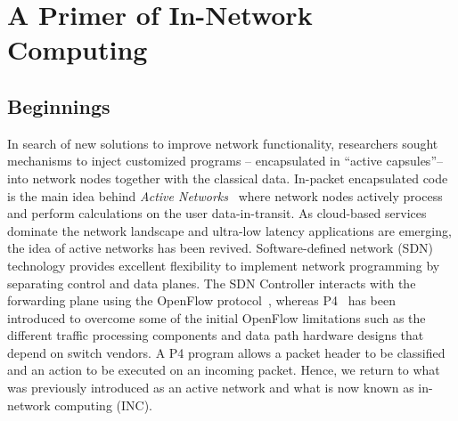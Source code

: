 \section{A Primer of In-Network Computing}\label{INC}
\subsection{Beginnings}
\noindent In search of new solutions to improve network functionality, researchers sought mechanisms to inject customized programs -- encapsulated in “active capsules”-- into network nodes together with the classical data. In-packet encapsulated code is the main idea behind \textit{Active Networks}~\cite{ACTIVE} where network nodes actively process and perform calculations on the user data-in-transit.
As cloud-based services dominate the network landscape and ultra-low latency applications are emerging, the idea of active networks has been revived. Software-defined network (SDN) technology  provides excellent flexibility to implement network programming by separating control and data planes.
%
%
%
%
The SDN Controller interacts with the forwarding plane using the OpenFlow protocol~\cite{mckeown2008openflow}, whereas P4~\cite{bosshart2014p4} has been introduced to overcome some of the initial OpenFlow limitations such as the different traffic processing components and data path hardware designs that depend on switch vendors. A P4 program allows a packet header to be classified and an action to be executed on an incoming packet. Hence, we return to what was previously introduced as an active network and what is now known as in-network computing (INC).

